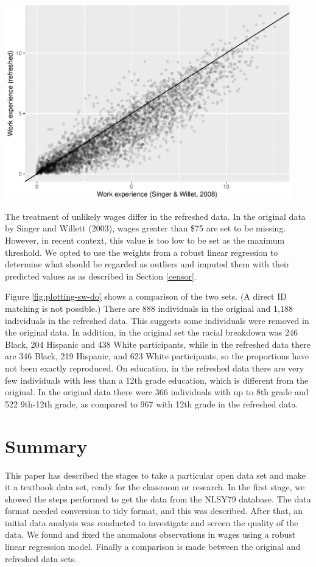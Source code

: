 \documentclass{article}
\begin{document}
\begin{center}\includegraphics[width=468px]{figures/compare_xp_sw-1} \end{center}

The treatment of unlikely wages differ in the refreshed data. In the original data by Singer and Willett (2003), wages greater than \$75 are set to be missing. However, in recent context, this value is too low to be set as the maximum threshold. We opted to use the weights from a robust linear regression to determine what should be regarded as outliers and imputed them with their predicted values as as described in Section \ref{censor}.

Figure \ref{fig:plotting-sw-do} shows a comparison of the two sets. (A direct ID matching is not possible.) There are 888 individuals in the original and 1,188 individuals in the refreshed data. This suggests some individuals were removed in the original data.
In addition, in the original set the racial breakdown was 246 Black, 204 Hispanic and 438 White participants, while in the refreshed data there are 346 Black, 219 Hispanic, and 623 White participants, so the proportions have not been exactly reproduced. On education, in the refreshed data there are very few individuals with less than a 12th grade education, which is different from the original. In the original data there were 366 individuals with up to 8th grade and 522 9th-12th grade, as compared to 967 with 12th grade in the refreshed data.

\hypertarget{summary}{%
\section{Summary}\label{summary}}

This paper has described the stages to take a particular open data set and make it a textbook data set, ready for the classroom or research. In the first stage, we showed the steps performed to get the data from the NLSY79 database. The data format needed conversion to tidy format, and this was described. After that, an initial data analysis was conducted to investigate and screen the quality of the data. We found and fixed the anomalous observations in wages using a robust linear regression model. Finally a comparison is made between the original and refreshed data sets.
\end{document}
